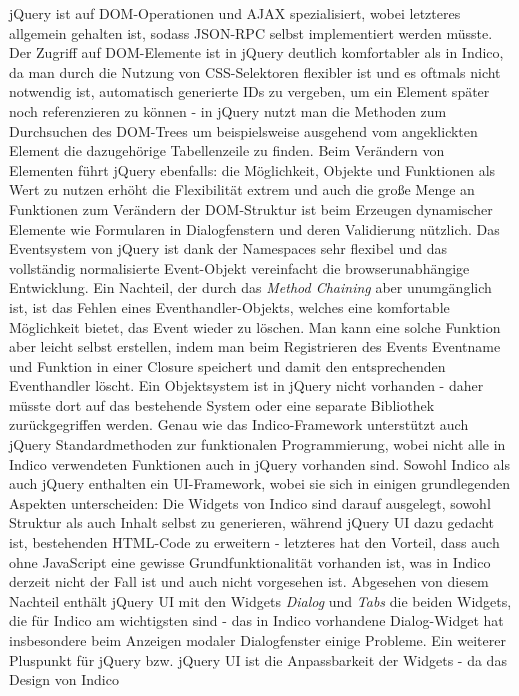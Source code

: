 jQuery ist auf DOM-Operationen und AJAX spezialisiert, wobei letzteres allgemein gehalten ist,
sodass JSON-RPC selbst implementiert werden müsste. Der Zugriff auf DOM-Elemente ist in jQuery
deutlich komfortabler als in Indico, da man durch die Nutzung von CSS-Selektoren flexibler ist und
es oftmals nicht notwendig ist, automatisch generierte IDs zu vergeben, um ein Element später noch
referenzieren zu können - in jQuery nutzt man die Methoden zum Durchsuchen des DOM-Trees um
beispielsweise ausgehend vom angeklickten Element die dazugehörige Tabellenzeile zu finden. Beim
Verändern von Elementen führt jQuery ebenfalls: die Möglichkeit, Objekte und Funktionen als Wert zu
nutzen erhöht die Flexibilität extrem und auch die große Menge an Funktionen zum Verändern der
DOM-Struktur ist beim Erzeugen dynamischer Elemente wie Formularen in Dialogfenstern und deren
Validierung nützlich. Das Eventsystem von jQuery ist dank der Namespaces sehr flexibel und das
vollständig normalisierte Event-Objekt vereinfacht die browserunabhängige Entwicklung. Ein Nachteil,
der durch das \emph{Method Chaining} aber unumgänglich ist, ist das Fehlen eines
Eventhandler-Objekts, welches eine komfortable Möglichkeit bietet, das Event wieder zu löschen. Man
kann eine solche Funktion aber leicht selbst erstellen, indem man beim Registrieren des Events
Eventname und Funktion in einer Closure speichert und damit den entsprechenden Eventhandler löscht.
Ein Objektsystem ist in jQuery nicht vorhanden - daher müsste dort auf das bestehende System oder
eine separate Bibliothek zurückgegriffen werden. Genau wie das Indico-Framework unterstützt auch
jQuery Standardmethoden zur funktionalen Programmierung, wobei nicht alle in Indico verwendeten
Funktionen auch in jQuery vorhanden sind. Sowohl Indico als auch jQuery enthalten ein UI-Framework,
wobei sie sich in einigen grundlegenden Aspekten unterscheiden: Die Widgets von Indico sind darauf
ausgelegt, sowohl Struktur als auch Inhalt selbst zu generieren, während jQuery UI dazu gedacht ist,
bestehenden HTML-Code zu erweitern - letzteres hat den Vorteil, dass auch ohne JavaScript eine
gewisse Grundfunktionalität vorhanden ist, was in Indico derzeit nicht der Fall ist und auch nicht
vorgesehen ist. Abgesehen von diesem Nachteil enthält jQuery UI mit den Widgets \emph{Dialog} und
\emph{Tabs} die beiden Widgets, die für Indico am wichtigsten sind - das in Indico vorhandene
Dialog-Widget hat insbesondere beim Anzeigen modaler Dialogfenster einige Probleme. Ein weiterer
Pluspunkt für jQuery bzw. jQuery UI ist die Anpassbarkeit der Widgets - da das Design von Indico
